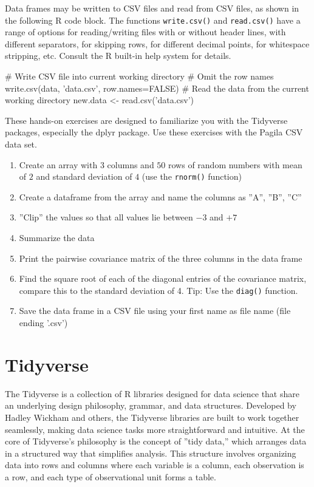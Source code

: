 Data frames may be written to CSV files and read from CSV files, as shown in the following R code block. The functions \texttt{write.csv()} and \texttt{read.csv()} have a range of options for reading/writing files with or without header lines, with different separators, for skipping rows, for different decimal points, for whitespace stripping, etc. Consult the R built-in help system for details.

\begin{Rcode}
# Write CSV file into current working directory
# Omit the row names
write.csv(data, 'data.csv', row.names=FALSE)
# Read the data from the current working directory
new.data <- read.csv('data.csv')
\end{Rcode}

\begin{exerciseboxcomputer}
These hands-on exercises are designed to familiarize you with the Tidyverse packages, especially the dplyr package. Use these exercises with the Pagila CSV data set.

\begin{enumerate}[nosep]
    \item Create an array with $3$ columns and $50$ rows of random numbers with mean of $2$ and standard deviation of $4$ (use the \texttt{rnorm()} function)
   \item Create a dataframe from the array and name the columns as ''A'', ''B'', ''C''
   \item ''Clip'' the values so that all values lie between $-3$ and $+7$
   \item Summarize the data
   \item Print the pairwise covariance matrix of the three columns in the data frame
   \item Find the square root of each of the diagonal entries of the covariance matrix, compare this to the standard deviation of 4. Tip: Use the \texttt{diag()} function.
   \item Save the data frame in a CSV file using your first name as file name (file ending '.csv')
\end{enumerate}
\end{exerciseboxcomputer}

\section{Tidyverse}

The Tidyverse is a collection of R libraries designed for data science that share an underlying design philosophy, grammar, and data structures. Developed by Hadley Wickham and others, the Tidyverse libraries are built to work together seamlessly, making data science tasks more straightforward and intuitive. At the core of Tidyverse's philosophy is the concept of ''tidy data,'' which arranges data in a structured way that simplifies analysis. This structure involves organizing data into rows and columns where each variable is a column, each observation is a row, and each type of observational unit forms a table.

